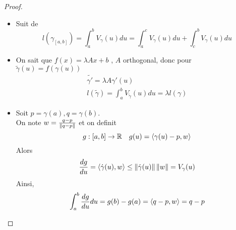 \documentclass[../main.tex]{subfiles}
\begin{document}
\begin{proof}
\begin{itemize}
\item Suit de 
	\[ 
		l( \gamma_{[a,b]} ) = \int_{ a }^{ b } V_\gamma( u) du = \int_{ a }^{ c }V_\gamma( u) du + \int_{ c }^{ b } V_\gamma( u)  du
	\]

\item On sait que $f( x) = \lambda Ax +b$ , $A$ orthogonal, donc pour $\tilde { \gamma} ( u) = f( \gamma( u) ) $ 
	\begin{align*}
		\tilde { \gamma'} = \lambda A \gamma' ( u) \\
		l( \tilde { \gamma} ) = \int_{ a }^{ b }V_{\tilde { \gamma} } ( u) du = \lambda l( \gamma) 
	\end{align*}

\item Soit $p= \gamma( a) , q = \gamma( b) $.\\
	On note $w = \frac{q-p}{\left\lVert q-p\right\rVert }$ et on definit
	\[ 
		g: [ a,b] \to \mathbb{R}\quad g( u) = \left\langle \gamma( u) - p, w\right\rangle 
	\]
Alors
\[ 
	\frac{dg}{du} = \left\langle \dot { \gamma} ( u) , w\right\rangle \leq \left\lVert \dot { \gamma} ( u) \right\rVert \left\lVert w\right\rVert = V_{\gamma} ( u) 
\]
Ainsi,
\[ 
	\int_{ a }^{ b } \frac{dg}{du} du = g( b) - g( a) = \left\langle q-p,w\right\rangle = q-p
\]

\end{itemize}
\end{proof}
\end{document}
